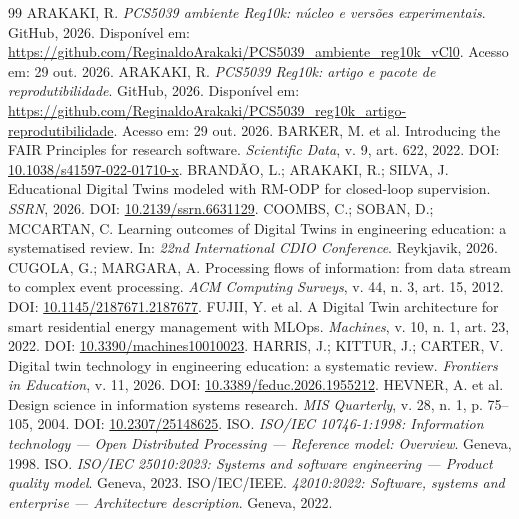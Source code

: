 \documentclass[10pt,a4paper]{article}
\newcommand{\repoReg}{\url{https://github.com/ReginaldoArakaki/PCS5039_ambiente_reg10k_vCl0}}
\newcommand{\repoArt}{\url{https://github.com/ReginaldoArakaki/PCS5039_reg10k_artigo-reprodutibilidade}}
\begin{document}
\begin{thebibliography}{99}
\small
{} ARAKAKI, R. \textit{PCS5039 ambiente Reg10k: núcleo e versões experimentais}. GitHub, 2026. Disponível em: \repoReg. Acesso em: 29 out. 2026.
 ARAKAKI, R. \textit{PCS5039 Reg10k: artigo e pacote de reprodutibilidade}. GitHub, 2026. Disponível em: \repoArt. Acesso em: 29 out. 2026.
 BARKER, M. et al. Introducing the FAIR Principles for research software. \textit{Scientific Data}, v. 9, art. 622, 2022. DOI: \href{https://doi.org/10.1038/s41597-022-01710-x}{10.1038/s41597-022-01710-x}.
 BRANDÃO, L.; ARAKAKI, R.; SILVA, J. Educational Digital Twins modeled with RM-ODP for closed-loop supervision. \textit{SSRN}, 2026. DOI: \href{https://doi.org/10.2139/ssrn.6631129}{10.2139/ssrn.6631129}.
 COOMBS, C.; SOBAN, D.; MCCARTAN, C. Learning outcomes of Digital Twins in engineering education: a systematised review. In: \textit{22nd International CDIO Conference}. Reykjavik, 2026.
 CUGOLA, G.; MARGARA, A. Processing flows of information: from data stream to complex event processing. \textit{ACM Computing Surveys}, v. 44, n. 3, art. 15, 2012. DOI: \href{https://doi.org/10.1145/2187671.2187677}{10.1145/2187671.2187677}.
 FUJII, Y. et al. A Digital Twin architecture for smart residential energy management with MLOps. \textit{Machines}, v. 10, n. 1, art. 23, 2022. DOI: \href{https://doi.org/10.3390/machines10010023}{10.3390/machines10010023}.
 HARRIS, J.; KITTUR, J.; CARTER, V. Digital twin technology in engineering education: a systematic review. \textit{Frontiers in Education}, v. 11, 2026. DOI: \href{https://doi.org/10.3389/feduc.2026.1955212}{10.3389/feduc.2026.1955212}.
 HEVNER, A. et al. Design science in information systems research. \textit{MIS Quarterly}, v. 28, n. 1, p. 75--105, 2004. DOI: \href{https://doi.org/10.2307/25148625}{10.2307/25148625}.
 ISO. \textit{ISO/IEC 10746-1:1998: Information technology --- Open Distributed Processing --- Reference model: Overview}. Geneva, 1998.
 ISO. \textit{ISO/IEC 25010:2023: Systems and software engineering --- Product quality model}. Geneva, 2023.
 ISO/IEC/IEEE. \textit{42010:2022: Software, systems and enterprise --- Architecture description}. Geneva, 2022.

\end{thebibliography}
\end{document}
